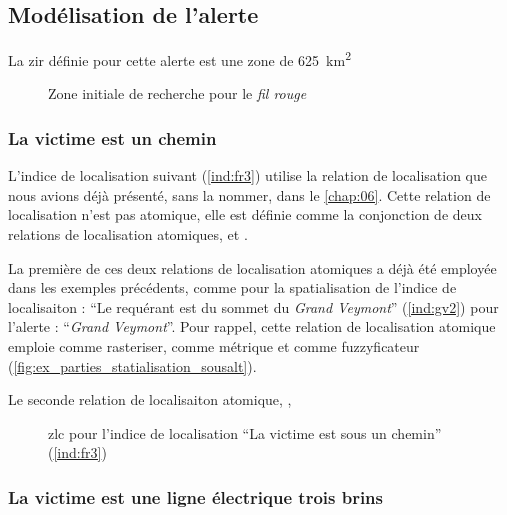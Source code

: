 \subsection{Modélisation de l'alerte}
\label{subsec:9-4-2}

La \ac{zir} définie pour cette alerte est une zone de
\SI{625}{\kilo\meter\squared}

\begin{figure}
  \centering
  
  \caption{Zone initiale de recherche pour le \emph{fil rouge}}
  \label{fig:zir_fil_rouge}
\end{figure}

\subsubsection{La victime est \protect{} un chemin}

L'indice de localisation suivant (\ref{ind:fr3}) utilise la relation
de localisation  que nous avions déjà
présenté, sans la nommer, dans le \autoref{chap:06}. Cette relation de
localisation n'est pas atomique, elle est définie comme la conjonction
de deux relations de localisation atomiques,
 et .

La première de ces deux relations de localisation atomiques
 a déjà été employée dans les exemples
précédents, comme pour la spatialisation de l'indice de localisaiton :
\enquote{Le requérant est  du sommet du
  \emph{Grand Veymont}} (\ref{ind:gv2}) pour l'alerte :
\enquote{\emph{Grand Veymont}}. Pour rappel, cette relation de
localisation atomique emploie  comme rasteriser,
 comme métrique et
 comme fuzzyficateur
(\autoref{fig:ex_parties_statialisation_sousalt}).

Le seconde relation de localisaiton atomique, ,


\begin{figure}
  \centering
  
  \caption{\ac{zlc} pour l'indice de localisation \enquote{La victime
      est sous un chemin} (\ref{ind:fr3})}
\end{figure}

\subsubsection{La victime est \protect{} une ligne
  électrique trois brins}

